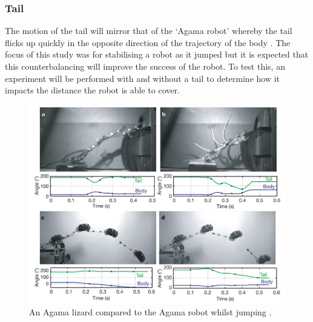 \documentclass{article}
\begin{document}
\newpage
\subsubsection{Tail}
\label{sec:Tail Movement}
The motion of the tail will mirror that of the ‘Agama robot’ whereby the tail flicks up quickly in the opposite direction of the trajectory of the body . The focus of this study was for stabilising a robot as it jumped but it is expected that this counterbalancing  will improve the success of the robot. To test this, an experiment will be performed with and without a tail to determine how it impacts the distance the robot is able to cover. 
\begin{figure}[H]
\centering
\includegraphics[scale=0.6]{agamaJump}
\caption{An Agama lizard compared to the Agama robot whilst jumping \citep{agama}.}
\end{figure}
\end{document}

